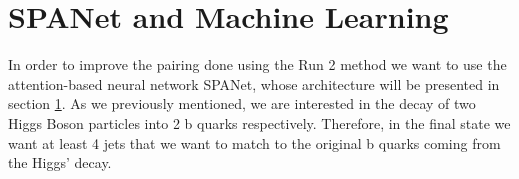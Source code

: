 \section{SPANet and Machine Learning} \label{section: spanet architecture}




In order to improve the pairing done using the Run 2 method we want to use the attention-based neural network SPANet, whose architecture will be presented in section \ref{section: spanet architecture}. As we previously mentioned, we are interested in the decay of two Higgs Boson particles into 2 b quarks respectively. Therefore, in the final state we want at least 4 jets that we want to match to the original b quarks coming from the Higgs' decay. 